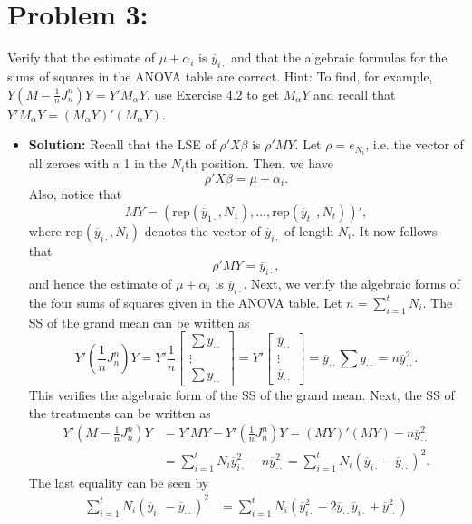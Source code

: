\documentclass[11pt]{article}
\begin{document}
\section*{Problem 3:}  Verify that the estimate of $\mu + \alpha_i$ is $\overline{y}_{i\cdot}$ and that the algebraic formulas for the sums of squares in the ANOVA table are correct.  Hint:  To find, for example, $Y(M - \frac{1}{n}J_n^n)Y = Y'M_\alpha Y$, use Exercise 4.2 to get $M_\alpha Y$ and recall that $Y'M_\alpha Y = (M_\alpha Y)'(M_\alpha Y)$.
\begin{itemize}
\item[] {\bf Solution:}    Recall that the LSE of $\rho'X\beta$ is $\rho'MY$.  Let $\rho = e_{N_i}$, i.e. the vector of all zeroes with a 1 in the $N_i$th position.  Then, we have
\[
\rho'X\beta = \mu + \alpha_i.
\]
Also, notice that
\[
MY = (\text{rep}(\overline{y}_{1\cdot}, N_1), ..., \text{rep}(\overline{y}_{t\cdot}, N_t))',
\]
where rep$(\overline{y}_{i\cdot}, N_i)$ denotes the vector of $\overline{y}_{i\cdot}$ of length $N_i$.  It now follows that
\[
\rho'MY = \overline{y}_{i\cdot},
\]
and hence the estimate of $\mu + \alpha_i$ is $\overline{y}_{i\cdot}$.  Next, we verify the algebraic forms of the four sums of squares given in the ANOVA table.  Let $n = \sum_{i=1}^t N_i$. The SS of the grand mean can be written as
\[
Y'\left(\frac{1}{n}J_n^n\right)Y = Y'\frac{1}{n}\begin{bmatrix}
\sum y_{\cdot\cdot} \\ \vdots \\ \sum y_{\cdot\cdot}
\end{bmatrix} = Y'\begin{bmatrix}
\overline{y}_{\cdot\cdot} \\ \vdots \\ \overline{y}_{\cdot\cdot}
\end{bmatrix} = \overline{y}_{\cdot\cdot}\sum y_{\cdot\cdot} = n\overline{y}^2_{\cdot\cdot}.
\]
This verifies the algebraic form of the SS of the grand mean.  Next, the SS of the treatments can be written as
\begin{align*}
Y'\left(M - \frac{1}{n}J_n^n\right) Y &= Y'MY - Y'\left(\frac{1}{n}J_n^n\right)Y = (MY)'(MY) - n\overline{y}^2_{\cdot\cdot} \\
&= \sum_{i=1}^t N_i\overline{y}_{i\cdot}^2 - n\overline{y}_{\cdot\cdot}^2 = \sum_{i=1}^t N_i(\overline{y}_{i\cdot} - \overline{y}_{\cdot\cdot})^2.
\end{align*}
The last equality can be seen by
\begin{align*}
\sum_{i=1}^t N_i(\overline{y}_{i\cdot} - \overline{y}_{\cdot\cdot})^2 &= \sum_{i=1}^tN_i(\overline{y}_{i\cdot}^2 - 2\overline{y}_{\cdot\cdot}\overline{y}_{i\cdot} + \overline{y}_{\cdot\cdot}^2) \\

\end{align*}
\end{itemize}
\end{document}
